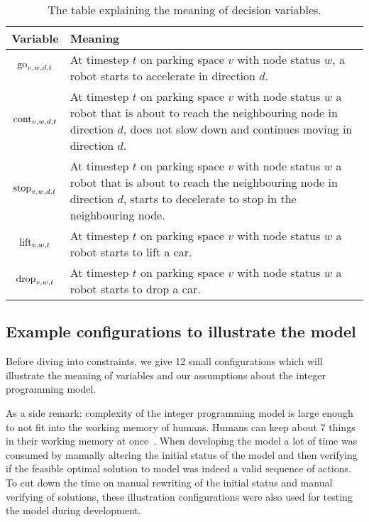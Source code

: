 \begin{table}[h]
    \center
    \begin{tabular}{| c | p{\textwidth - 2.6cm} |}
        \hline
        Variable & Meaning\\
        \hline
        $\mathrm{go}_{v,w,d,t}$ & At timestep $t$ on parking space $v$ with node status
        $w$, a robot starts to accelerate in direction $d$.\\ \hline
        $\mathrm{cont}_{v,w,d,t}$ & At timestep $t$ on parking space $v$ with node status
        $w$ a robot that is about to reach the neighbouring node in direction
        $d$, does not slow down and continues moving in direction $d$.\\ \hline
        $\mathrm{stop}_{v,w,d,t}$ & At timestep $t$ on parking space $v$ with node status
        $w$ a robot that is about to reach the neighbouring node in direction
        $d$, starts to decelerate to stop in the neighbouring node.\\ \hline
        $\mathrm{lift}_{v,w,t}$ & At timestep $t$ on parking space $v$ with node status
        $w$ a robot starts to lift a car.\\ \hline
        $\mathrm{drop}_{v,w,t}$ & At timestep $t$ on parking space $v$ with node status
        $w$ a robot starts to drop a car.\\
        \hline
    \end{tabular}
    \caption{The table explaining the meaning of decision variables.}
    \label{tbl:decvars}
\end{table}

\subsection{Example configurations to illustrate the model}
Before diving into constraints, we give 12 small configurations which will
illustrate the meaning of variables and our assumptions about the integer
programming model.

As a side remark: complexity of the integer programming model is large enough
to not fit into the working memory of humans. Humans can keep about 7 things in
their working memory at once~\cite{magic7}. When developing the model a lot of
time was consumed by manually altering the initial status of the model and then
verifying if the feasible optimal solution to model was indeed a valid sequence
of actions. To cut down the time on manual rewriting of the initial status and
manual verifying of solutions, these illustration configurations were also used
for testing the model during development.

